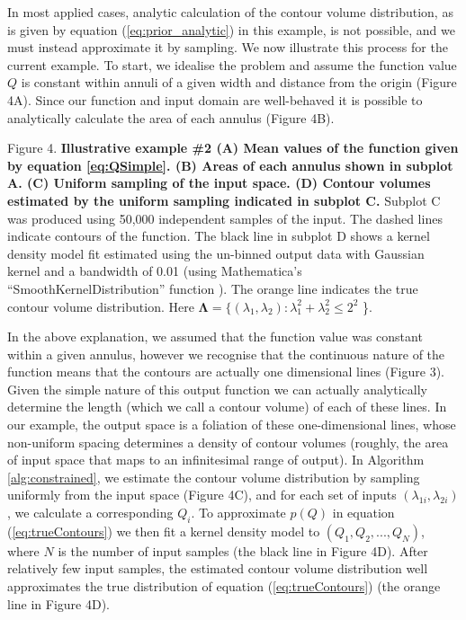 \documentclass[10pt,letterpaper]{article}
\begin{document}

In most applied cases, analytic calculation of the contour volume distribution, as is given by equation (\ref{eq:prior_analytic}) in this example, is not possible, and we must instead approximate it by sampling. We now illustrate this process for the current example. To start, we idealise the problem and assume the function value $Q$ is constant within annuli of a given width and distance from the origin (Figure 4A). Since our function and input domain are well-behaved it is possible to analytically calculate the area of each annulus (Figure 4B).

\vspace{0.5cm}

Figure 4. \textbf{Illustrative example \#2 (A) Mean values of the function given by equation \eqref{eq:QSimple}. (B) Areas of each annulus shown in subplot A. (C) Uniform sampling of the input space. (D) Contour volumes estimated by the uniform sampling indicated in subplot C.} Subplot C was produced using 50,000 independent samples of the input. The dashed lines indicate contours of the function. The black line in subplot D shows a kernel density model fit estimated using the un-binned output data with Gaussian kernel and a bandwidth of 0.01 (using Mathematica's ``SmoothKernelDistribution'' function \cite{mathematica}). The orange line indicates the true contour volume distribution. Here $\boldsymbol{\Lambda} = \{ (\lambda_1,\lambda_2): \lambda_1^2+\lambda_2^2\leq2^2$ \}.

\vspace{0.5cm}

In the above explanation, we assumed that the function value was constant within a given annulus, however we recognise that the continuous nature of the function means that the contours are actually one dimensional lines (Figure 3). Given the simple nature of this output function we can actually analytically determine the length (which we call a contour volume) of each of these lines. In our example, the output space is a foliation of these one-dimensional lines, whose non-uniform spacing determines a density of contour volumes (roughly, the area of input space that maps to an infinitesimal range of output). In Algorithm \ref{alg:constrained}, we estimate the contour volume distribution by sampling uniformly from the input space (Figure 4C), and for each set of inputs $(\lambda_{1i},\lambda_{2i})$, we calculate a corresponding $Q_i$. To approximate $p(Q)$ in equation (\ref{eq:trueContours}) we then fit a kernel density model to $(Q_1,Q_2,...,Q_N)$, where $N$ is the number of input samples (the black line in Figure 4D). After relatively few input samples, the estimated contour volume distribution well approximates the true distribution of equation (\ref{eq:trueContours}) (the orange line in Figure 4D).
\end{document}
